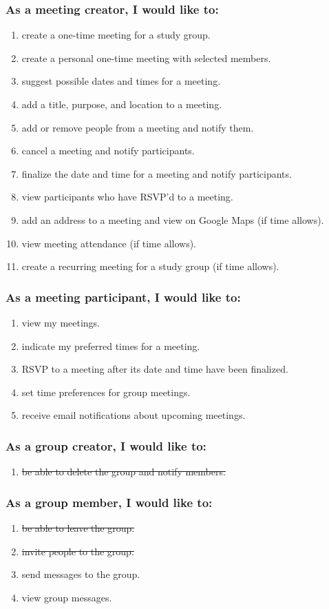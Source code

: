 \documentclass[12pt]{article}
\begin{document}
\subsubsection*{As a meeting creator, I would like to:}

\begin{enumerate}[nolistsep]
    \item create a one-time meeting for a study group.
    \item create a personal one-time meeting with selected members.
    \item suggest possible dates and times for a meeting.
    \item add a title, purpose, and location to a meeting.
    \item add or remove people from a meeting and notify them.
    \item cancel a meeting and notify participants.
    \item finalize the date and time for a meeting and notify participants.
    \item view participants who have RSVP'd to a meeting.
    \item add an address to a meeting and view on Google Maps (if time allows).
    \item view meeting attendance (if time allows).
    \item create a recurring meeting for a study group (if time allows).
\end{enumerate}

\subsubsection*{As a meeting participant, I would like to:}

\begin{enumerate}[nolistsep]
    \item view my meetings.
    \item indicate my preferred times for a meeting.
    \item RSVP to a meeting after its date and time have been finalized.
    \item set time preferences for group meetings.
    \item receive email notifications about upcoming meetings.
\end{enumerate}

\subsubsection*{As a group creator, I would like to:}
\begin{enumerate}[nolistsep]
    \item \st{be able to delete the group and notify members.}
\end{enumerate}

\subsubsection*{As a group member, I would like to:}
\begin{enumerate}[nolistsep]
    \item \st{be able to leave the group.}
    \item \st{invite people to the group.}
    \item send messages to the group.
    \item view group messages.
\end{enumerate}
\end{document}
